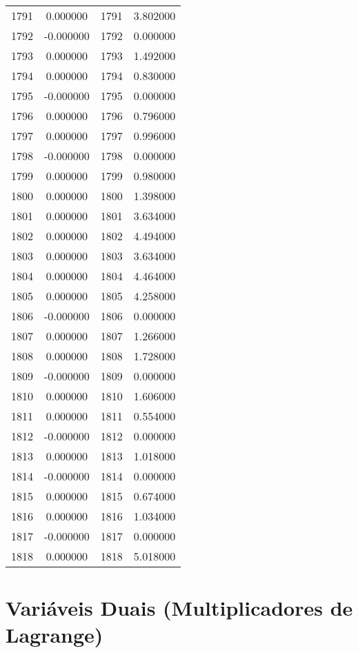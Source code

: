 \documentclass[12pt]{article}
\begin{document}
\begin{longtable}{@{}cccc@{}}
1791 & 0.000000 & 1791 & 3.802000 \\
1792 & -0.000000 & 1792 & 0.000000 \\
1793 & 0.000000 & 1793 & 1.492000 \\
1794 & 0.000000 & 1794 & 0.830000 \\
1795 & -0.000000 & 1795 & 0.000000 \\
1796 & 0.000000 & 1796 & 0.796000 \\
1797 & 0.000000 & 1797 & 0.996000 \\
1798 & -0.000000 & 1798 & 0.000000 \\
1799 & 0.000000 & 1799 & 0.980000 \\
1800 & 0.000000 & 1800 & 1.398000 \\
1801 & 0.000000 & 1801 & 3.634000 \\
1802 & 0.000000 & 1802 & 4.494000 \\
1803 & 0.000000 & 1803 & 3.634000 \\
1804 & 0.000000 & 1804 & 4.464000 \\
1805 & 0.000000 & 1805 & 4.258000 \\
1806 & -0.000000 & 1806 & 0.000000 \\
1807 & 0.000000 & 1807 & 1.266000 \\
1808 & 0.000000 & 1808 & 1.728000 \\
1809 & -0.000000 & 1809 & 0.000000 \\
1810 & 0.000000 & 1810 & 1.606000 \\
1811 & 0.000000 & 1811 & 0.554000 \\
1812 & -0.000000 & 1812 & 0.000000 \\
1813 & 0.000000 & 1813 & 1.018000 \\
1814 & -0.000000 & 1814 & 0.000000 \\
1815 & 0.000000 & 1815 & 0.674000 \\
1816 & 0.000000 & 1816 & 1.034000 \\
1817 & -0.000000 & 1817 & 0.000000 \\
1818 & 0.000000 & 1818 & 5.018000 \\

\end{longtable}

\section{Variáveis Duais (Multiplicadores de Lagrange)}
\end{document}
